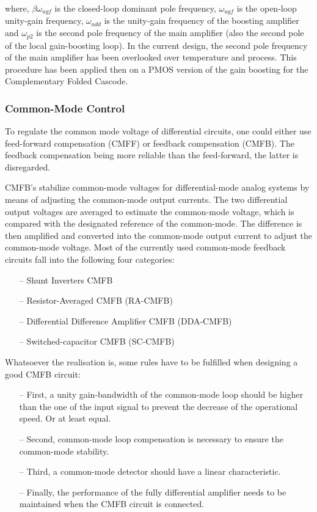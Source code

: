 where, \(\beta\omega_{ugf} \) is the closed-loop dominant pole frequency, \(\omega_{ugf} \) is the open-loop unity-gain frequency, \(\omega_{add} \) is the unity-gain frequency of the boosting amplifier and \(\omega_{p2} \) is the second pole frequency of the main amplifier (also the second pole of the local gain-boosting loop). In the current design, the second pole frequency of the main amplifier has been overlooked over temperature and process. This procedure has been applied then on a PMOS version of the gain boosting for the Complementary Folded Cascode.

\subsubsection{Common-Mode Control}
To regulate the common mode voltage of differential circuits, one could either use feed-forward compensation (CMFF) or feedback compensation (CMFB). The feedback compensation being more reliable than the feed-forward, the latter is disregarded.

CMFB’s stabilize common-mode voltages for differential-mode analog systems by means of adjusting the common-mode output currents. The two differential output voltages are averaged to estimate the common-mode voltage, which is compared with the designated reference of the common-mode. The difference is then amplified and converted into the common-mode output current to adjust the common-mode voltage. Most of the currently used common-mode feedback circuits fall into the following four categories:

\begin{itemize}
    \itemsep-0.5em
    \item[--] Shunt Inverters CMFB
    \item[--] Resistor-Averaged CMFB (RA-CMFB)
    \item[--] Differential Difference Amplifier CMFB (DDA-CMFB)
    \item[--] Switched-capacitor CMFB (SC-CMFB)
\end{itemize}

Whatsoever the realisation is, some rules have to be fulfilled when designing a good CMFB circuit:

\begin{itemize}
    \itemsep-0.5em
    \item[--] First, a unity gain-bandwidth of the common-mode loop should be higher than the one of the input signal to prevent the decrease of the operational speed. Or at least equal.
    \item[--] Second, common-mode loop compensation is necessary to ensure the common-mode stability.
    \item[--] Third, a common-mode detector should have a linear characteristic.
    \item[--] Finally, the performance of the fully differential amplifier needs to be maintained when the CMFB circuit is connected.
\end{itemize}

